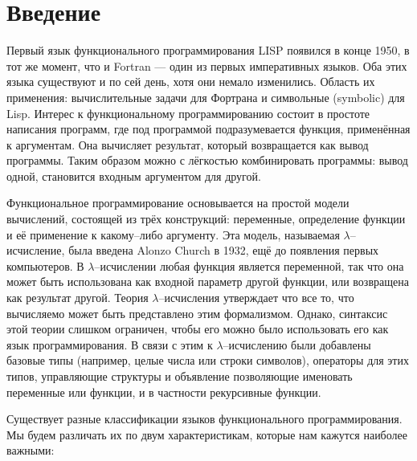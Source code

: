 \section{Введение}
\label{sec:intro_2}

Первый язык функционального программирования LISP появился в конце 1950, в тот
же момент, что и Fortran --- один из первых императивных языков. Оба этих языка
существуют и по сей день, хотя они немало изменились. Область их применения:
вычислительные задачи для Фортрана и символьные (symbolic) для Lisp. Интерес к
функциональному программированию состоит в простоте написания программ, где под
программой подразумевается функция, применённая к аргументам. Она вычисляет
результат, который возвращается как вывод программы. Таким образом можно с
лёгкостью комбинировать программы: вывод одной, становится входным аргументом
для другой.

Функциональное программирование основывается на простой модели вычислений,
состоящей из трёх конструкций: переменные, определение функции и её применение к
какому--либо аргументу. Эта модель, называемая $\lambda$--исчисление, была
введена Alonzo Church в 1932, ещё до появления первых компьютеров. В
$\lambda$--исчислении любая функция является переменной, так что она может быть
использована как входной параметр другой функции, или возвращена как результат
другой. Теория $\lambda$--исчисления утверждает что все то, что вычисляемо может
быть представлено этим формализмом. Однако, синтаксис этой теории слишком
ограничен, чтобы его можно было использовать его как язык программирования. В
связи с этим к $\lambda$--исчислению были добавлены базовые типы (например,
целые числа или строки символов), операторы для этих типов, управляющие
структуры и объявление позволяющие именовать переменные или функции, и в
частности рекурсивные функции.

Существует разные классификации языков функционального программирования. Мы
будем различать их по двум характеристикам, которые нам кажутся наиболее
важными:

